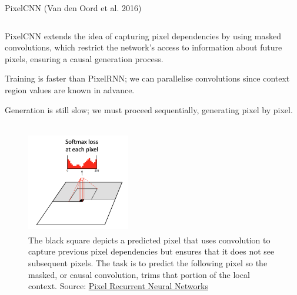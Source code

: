 \documentclass[9pt]{beamer}
\begin{document}
\begin{frame}{PixelCNN (Van den Oord et al. 2016)}
  \begin{column}{0.50\textwidth}
        \begin{itemsize}
            \item PixelCNN extends the idea of capturing pixel dependencies by using masked convolutions, which restrict the network's access to information about future pixels, ensuring a causal generation process.
            \vspace{0.1cm}
            \item Training is faster than PixelRNN; we can parallelise convolutions since context region values are known in advance.
            \vspace{0.1cm}
            \item Generation is still slow; we must proceed sequentially, generating pixel by pixel.
            \vspace{0.1cm}
        \end{itemsize}
    \end{column}
    \begin{column}{0.50\textwidth}
        \begin{figure}
            \centering
            \includegraphics[width = 4.5cm, height=4.5cm]{diapositivas/img/pixelcnn.png}
            \caption{The black square depicts a predicted pixel that uses convolution to capture previous pixel dependencies but ensures that it does not see subsequent pixels. The task is to predict the following pixel so the masked, or causal convolution, trims that portion of the local context. Source: \href{https://arxiv.org/abs/1601.06759}{Pixel Recurrent Neural Networks}}
            \label{fig:enter-label}
        \end{figure}
    \end{column}
\end{frame}


% 
\end{document}
